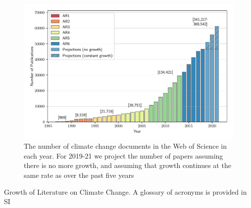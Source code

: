 \documentclass{article}
\begin{document}
\begin{linenumbers}
		\begin{figure}[htp]
			\begin{center}
				\includegraphics[width=180mm]{plots_pub/pubs_time_wgb.pdf}
				\caption{ The number of climate change documents in the Web of Science in each year. For 2019-21 we project the number of papers assuming there is no more growth, and assuming that growth continues at the same rate as over the past five years}
				\label{pub-growth}
			\end{center}
		\end{figure}
		
		
		\begin{table}[htp]
			{\scriptsize
				}
			\caption{Growth of Literature on Climate Change. A glossary of acronyms is provided in SI}
			\label{tab}
		\end{table}
		

\end{linenumbers}
\end{document}
